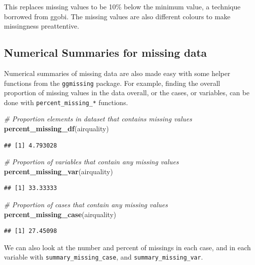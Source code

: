 \documentclass[]{article}
\newenvironment{Shaded}{\begin{snugshade}}{\end{snugshade}}
\newcommand{\KeywordTok}[1]{\textcolor[rgb]{0.13,0.29,0.53}{\textbf{{#1}}}}
\newcommand{\CommentTok}[1]{\textcolor[rgb]{0.56,0.35,0.01}{\textit{{#1}}}}
\newcommand{\NormalTok}[1]{{#1}}
\begin{document}
This replaces missing values to be 10\% below the minimum value, a
technique borrowed from ggobi. The missing values are also different
colours to make missingness preattentive.

\subsection{Numerical Summaries for missing
data}\label{numerical-summaries-for-missing-data}

Numerical summaries of missing data are also made easy with some helper
functions from the \texttt{ggmissing} package. For example, finding the
overall proportion of missing values in the data overall, or the cases,
or variables, can be done with \texttt{percent\_missing\_*} functions.

\begin{Shaded}
\begin{Highlighting}[]
\CommentTok{# Proportion elements in dataset that contains missing values}
\KeywordTok{percent_missing_df}\NormalTok{(airquality)}
\end{Highlighting}
\end{Shaded}

\begin{verbatim}
## [1] 4.793028
\end{verbatim}

\begin{Shaded}
\begin{Highlighting}[]
\CommentTok{# Proportion of variables that contain any missing values}
\KeywordTok{percent_missing_var}\NormalTok{(airquality)}
\end{Highlighting}
\end{Shaded}

\begin{verbatim}
## [1] 33.33333
\end{verbatim}

\begin{Shaded}
\begin{Highlighting}[]
 \CommentTok{# Proportion of cases that contain any missing values}
\KeywordTok{percent_missing_case}\NormalTok{(airquality)}
\end{Highlighting}
\end{Shaded}

\begin{verbatim}
## [1] 27.45098
\end{verbatim}

We can also look at the number and percent of missings in each case, and
in each variable with \texttt{summary\_missing\_case}, and
\texttt{summary\_missing\_var}.
\end{document}
